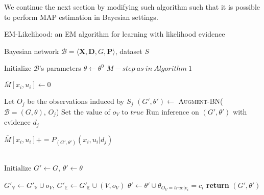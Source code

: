 \documentclass[11pt]{article}
\begin{document}
We continue the next section by modifying such algorithm such that
it is possible to perform MAP estimation in Bayesian settings.


\algrenewcommand\algorithmicindent{1.5em}%

\begin{algorithm*}[h!]
\caption{EM-Likelihood: an EM algorithm for learning with likelihood evidence}
\label{alg:EM-Likelihood}
\vspace{-10pt}
\begin{multicols}{2}
\begin{algorithmic}[1] 
\Require Bayesian network $\mathcal{B}=\langle \mathbf{X},\mathbf{D}, G, \mathbf{P} \rangle$, dataset $S$ 

\State Initialize $\mathcal{B}$'s parameters $\theta \leftarrow \theta^0$
  \State $M-step \ as \ in \ Algorithm \ 1$
\EndFor
\EndProcedure
\\

   \State $\bar{M}[x_{i},u_{i}]\leftarrow 0$
  \EndFor
\EndFor


    \State Let $O_j$ be the observations induced by $S_j$
    \State $(G',\theta') \leftarrow$ \textsc{Augment-BN}($\mathcal{B}=(G,\theta)$, $O_{j}$)
      \State Set the value of $o_V$ to $true$
    \EndFor
    \State Run inference on $(G',\theta')$ with evidence $d_{j}$
    
        \State $\bar{M}[x_{i},u_{i}] \mathrel{{+}{=}} P_{(G',\theta')}(x_{i},u_{i}|d_{j})$
    
      \EndFor
    \EndFor
\EndFor
\EndFunction
\\
  \State Initialize $G'\leftarrow G$, $\theta'\leftarrow\theta$

    \State $G'_{\mathbb{V}}\leftarrow G'_{\mathbb{V}}\cup o_{V}$, $G'_{\mathbb{E}}\leftarrow G'_{\mathbb{E}}\cup(V,o_{V})$      
       
      \State $\theta'\leftarrow\theta'\cup\theta_{O_{V}=true|v_{i}}=c_{i}$ 
    \EndFor
  \EndFor
\State \textbf{return} $(G',\theta')$
\end{algorithmic}
\end{multicols}
\end{algorithm*}
\end{document}
